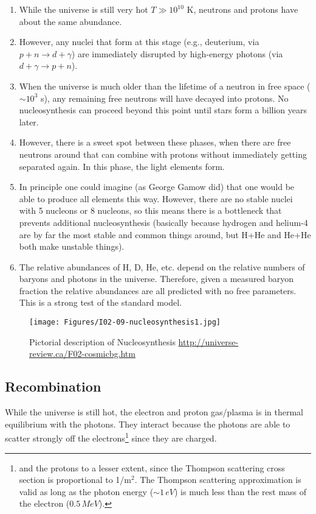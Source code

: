 \begin{enumerate}
\item While the universe is still very hot $T \gg 10^{10}$ K, 
	neutrons and protons have about the same abundance.

\item However, any nuclei that form at this stage (e.g., deuterium, 
	via $p + n \rightarrow d + \gamma$) are immediately disrupted 
	by high-energy photons (via $d + \gamma \rightarrow p + n$).

\item When the universe is much older than the lifetime of a neutron 
	in free space ($\sim10^3$ s), any remaining free neutrons will 
	have decayed into protons. No nucleosynthesis can proceed beyond 
	this point until stars form a billion years later.

\item However, there is a sweet spot between these phases, when 
	there are free neutrons around that can combine with protons 
	without immediately getting separated again. In this phase, the 
	light elements form.

\item In principle one could imagine (as George Gamow did) that one 
	would be able to produce all elements this way. However, there 
	are no stable nuclei with 5 nucleons or 8 nucleons, so this 
	means there is a bottleneck that prevents additional 
	nucleosynthesis (basically because hydrogen and helium-4 are by 
	far the most stable and common things around, but H+He and He+He 
	both make unstable things).

\item The relative abundances of H, D, He, etc. depend on the 
	relative numbers of baryons and photons in the universe. 
	Therefore, given a measured baryon fraction the relative abundances 
	are all predicted with no free parameters. This is a strong test of the
	standard model.
\end{enumerate}
\begin{figure}[h]
\centering
\texttt{[image: Figures/I02-09-nucleosynthesis1.jpg]}
\caption{Pictorial description of Nucleosynthesis \url{http://universe-review.ca/F02-cosmicbg.htm}}
\label{fig:Neutrons}
\end{figure}


\subsection{Recombination}
While the universe is still hot, the electron and proton gas/plasma is in thermal equilibrium with the photons. They interact because the photons are able to scatter strongly off the electrons\footnote{and the protons to a lesser extent, since the Thompson scattering cross section is proportional to 1/m$^2$. The Thompson scattering approximation is valid as long as the photon 
energy ($\sim 1\,eV$) is much less than the rest mass of the 
electron ($0.5\,MeV$).} since they are charged.

